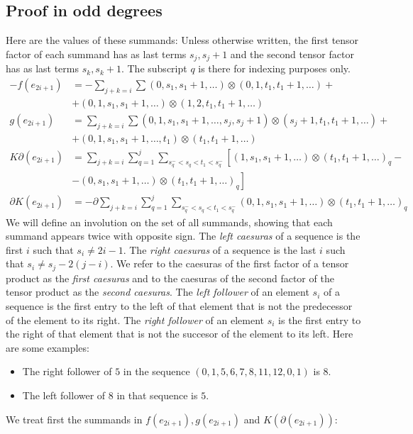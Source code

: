 \subsection*{Proof in odd degrees} Here are the values of these summands: Unless otherwise written, the first tensor factor of each summand has as last terms $s_j,s_j+1$ and the second tensor factor has as last terms $s_k,s_k+1$. The subscript $q$ is there for indexing purposes only.
\begin{align*}
-f(e_{2i+1}) &= -\sum_{j+k=i}\sum (0,s_1,s_1+1,\ldots)\otimes (0,1,t_1,t_1+1,\ldots) + 
\\
&+(0,1,s_1,s_1+1,\ldots)\otimes (1,2,t_1,t_1+1,\ldots) 
\\
g(e_{2i+1}) &= \sum_{j+k=i}\sum (0,1,s_1,s_1+1,\ldots,s_j,s_j+1)\otimes(s_j+1,t_1,t_1+1,\ldots) + 
\\
&+ (0,1,s_1,s_1+1,\ldots,t_1)\otimes(t_1,t_1+1,\ldots)
\\
K\partial(e_{2i+1}) &= \sum_{j+k=i}\sum_{q=1}^j\sum_{s_q^-<s_q<t_1<s_q^-} \left[(1,s_1,s_1+1,\ldots)\otimes(t_1,t_1+1,\ldots)_q\right. -
\\
&- \left.(0,s_1,s_1+1,\ldots)\otimes(t_1,t_1+1,\ldots)_q\right]
\\
\partial K(e_{2i+1}) &= -\partial\sum_{j+k=i}\sum_{q=1}^j\sum_{s_q^-<s_q<t_1<s_q^-}(0,1,s_1,s_1+1,\ldots)\otimes (t_1,t_1+1,\ldots)_q
\end{align*}
We will define an involution on the set of all summands, showing that each summand appears twice with opposite sign. The \emph{left caesuras} of a sequence is the first $i$ such that $s_i\neq 2i-1$. The \emph{right caesuras} of a sequence is the last $i$ such that $s_i\neq s_j-2(j-i)$. We refer to the caesuras of the first factor of a tensor product as the \emph{first caesuras} and to the caesuras of the second factor of the tensor product as the \emph{second caesuras}. The \emph{left follower} of an element $s_i$ of a sequence is the first entry to the left of that element that is not the predecessor of the element to its right. The \emph{right follower} of an element $s_{i}$ is the first entry to the right of that element that is not the succesor of the element to its left. Here are some examples:
\begin{itemize}
\item The right follower of $5$ in the sequence $(0,1,5,6,7,8,11,12,0,1)$ is $8$.
\item The left follower of $8$ in that sequence is $5$.
\end{itemize}
We treat first the summands in $f(e_{2i+1}), g(e_{2i+1})$ and $K(\partial(e_{2i+1}))$:
